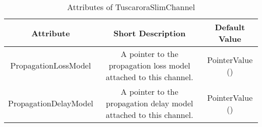  \begin{longtable}{ | c | c | c |}

\caption{Attributes of TuscaroraSlimChannel}\label{table:TuscaroraSlimChannelTableofAttributes}	\\
 
     \hline
  \textbf{Attribute} & \textbf{Short Description} & \textbf{Default Value} \\ \hline
 
 PropagationLossModel & \parbox{6cm}{\centering A pointer to the propagation loss model attached to this channel.} & 
                   PointerValue () \\ \hline 

 PropagationDelayModel & \parbox{6cm}{\centering A pointer to the propagation delay model attached to this channel.} & 
                   PointerValue () \\ \hline 
			   
				   
				   
	   
 \end{longtable}   
